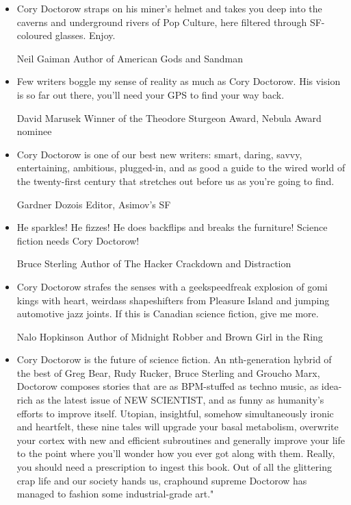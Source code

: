 \begin{itemize}
\item
  Cory Doctorow straps on his miner's helmet and takes you deep into
  the caverns and underground rivers of Pop Culture, here filtered
  through SF-coloured glasses. Enjoy.

  \begin{authorof}
    Neil Gaiman Author of American Gods and Sandman
  \end{authorof}
\item
  Few writers boggle my sense of reality as much as Cory Doctorow.
  His vision is so far out there, you'll need your GPS to find your
  way back.

  \begin{authorof}
    David Marusek Winner of the Theodore Sturgeon Award, Nebula Award
    nominee
  \end{authorof}
\item
  Cory Doctorow is one of our best new writers: smart, daring, savvy,
  entertaining, ambitious, plugged-in, and as good a guide to the
  wired world of the twenty-first century that stretches out before
  us as you're going to find.

  \begin{authorof}
    Gardner Dozois Editor, Asimov's SF
  \end{authorof}
\item
  He sparkles! He fizzes! He does backflips and breaks the furniture!
  Science fiction needs Cory Doctorow!

  \begin{authorof}
    Bruce Sterling Author of The Hacker Crackdown and Distraction
  \end{authorof}
\item
  Cory Doctorow strafes the senses with a geekspeedfreak explosion of
  gomi kings with heart, weirdass shapeshifters from Pleasure Island
  and jumping automotive jazz joints. If this is Canadian science
  fiction, give me more.

  \begin{authorof}
    Nalo Hopkinson Author of Midnight Robber and Brown Girl in the Ring
  \end{authorof}
\item
  Cory Doctorow is the future of science fiction. An nth-generation
  hybrid of the best of Greg Bear, Rudy Rucker, Bruce Sterling and
  Groucho Marx, Doctorow composes stories that are as BPM-stuffed as
  techno music, as idea-rich as the latest issue of NEW SCIENTIST,
  and as funny as humanity's efforts to improve itself. Utopian,
  insightful, somehow simultaneously ironic and heartfelt, these nine
  tales will upgrade your basal metabolism, overwrite your cortex
  with new and efficient subroutines and generally improve your life
  to the point where you'll wonder how you ever got along with them.
  Really, you should need a prescription to ingest this book. Out of
  all the glittering crap life and our society hands us, craphound
  supreme Doctorow has managed to fashion some industrial-grade
  art."


\end{itemize}
